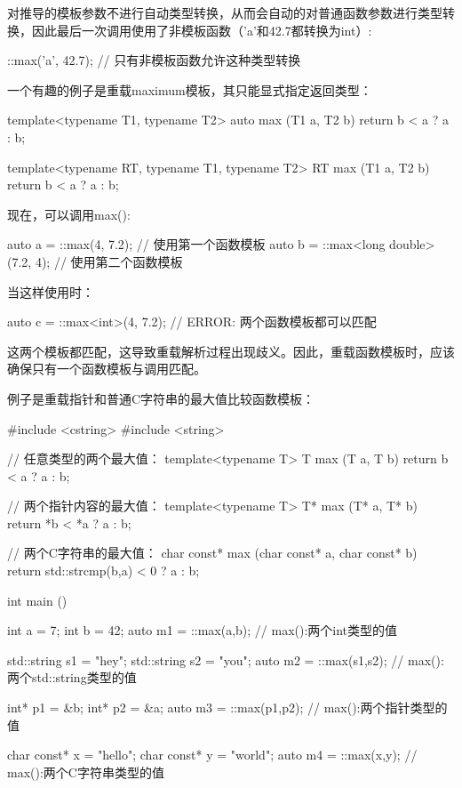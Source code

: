 对推导的模板参数不进行自动类型转换，从而会自动的对普通函数参数进行类型转换，因此最后一次调用使用了非模板函数（'a'和42.7都转换为int）:

\begin{cpp}
::max('a', 42.7); // 只有非模板函数允许这种类型转换
\end{cpp}

一个有趣的例子是重载maximum模板，其只能显式指定返回类型：

\begin{cpp}
template<typename T1, typename T2>
auto max (T1 a, T2 b) {
	return b < a ? a : b;
}

template<typename RT, typename T1, typename T2>
RT max (T1 a, T2 b) {
	return b < a ? a : b;
}
\end{cpp}

现在，可以调用max():

\begin{cpp}
auto a = ::max(4, 7.2); // 使用第一个函数模板
auto b = ::max<long double>(7.2, 4); // 使用第二个函数模板
\end{cpp}

当这样使用时：

\begin{cpp}
auto c = ::max<int>(4, 7.2); // ERROR: 两个函数模板都可以匹配
\end{cpp}

这两个模板都匹配，这导致重载解析过程出现歧义。因此，重载函数模板时，应该确保只有一个函数模板与调用匹配。

例子是重载指针和普通C字符串的最大值比较函数模板：

\begin{cpp}
#include <cstring>
#include <string>

// 任意类型的两个最大值：
template<typename T>
T max (T a, T b) {
	return b < a ? a : b;
}

// 两个指针内容的最大值：
template<typename T>
T* max (T* a, T* b) {
	return *b < *a ? a : b;
}

// 两个C字符串的最大值：
char const* max (char const* a, char const* b) {
	return std::strcmp(b,a) < 0 ? a : b;
}

int main () {
	int a = 7;
	int b = 42;
	auto m1 = ::max(a,b); // max():两个int类型的值
	
	std::string s1 = "hey";
	std::string s2 = "you";
	auto m2 = ::max(s1,s2); // max():两个std::string类型的值
	
	int* p1 = &b;
	int* p2 = &a;
	auto m3 = ::max(p1,p2); // max():两个指针类型的值
	
	char const* x = "hello";
	char const* y = "world";
	auto m4 = ::max(x,y); // max():两个C字符串类型的值
}
\end{cpp}

